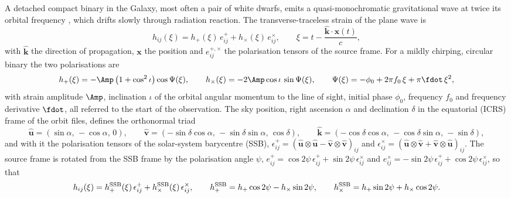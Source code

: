 A detached compact binary in the Galaxy, most often a pair of white dwarfs, emits a
quasi-monochromatic gravitational wave at twice its orbital frequency
\citep{nelemans2001gravitational,korol2017prospects}, which drifts slowly through radiation
reaction. The transverse-traceless strain of the plane wave is
\begin{equation}
  h_{ij}(\xi) = h_+(\xi)\,e^+_{ij} + h_\times(\xi)\,e^\times_{ij},\qquad
  \xi = t - \frac{\hat{\mathbf k}\cdot\mathbf x(t)}{c},
  \label{eq:xi}
\end{equation}
with $\hat{\mathbf k}$ the direction of propagation, $\mathbf x$ the position and
$e^{+,\times}_{ij}$ the polarisation tensors of the source frame. For a mildly chirping,
circular binary the two polarisations are
\begin{equation}
  h_+(\xi) = -\Amp\,\bigl(1+\cos^2\iota\bigr)\cos\Psi(\xi),\qquad
  h_\times(\xi) = -2\Amp\cos\iota\,\sin\Psi(\xi),\qquad
  \Psi(\xi) = -\phi_0 + 2\pi f_0\,\xi + \pi\fdot\,\xi^2,
  \label{eq:waveform}
\end{equation}
with strain amplitude $\Amp$, inclination $\iota$ of the orbital angular momentum to the line
of sight, initial phase $\phi_0$, frequency $f_0$ and frequency derivative $\fdot$, all
referred to the start of the observation. The sky position, right ascension $\alpha$ and
declination $\delta$ in the equatorial (ICRS) frame of the orbit files, defines the
orthonormal triad
\begin{equation}
  \hat{\mathbf u} = (\sin\alpha,\,-\cos\alpha,\,0),\qquad
  \hat{\mathbf v} = (-\sin\delta\cos\alpha,\,-\sin\delta\sin\alpha,\,\cos\delta),\qquad
  \hat{\mathbf k} = (-\cos\delta\cos\alpha,\,-\cos\delta\sin\alpha,\,-\sin\delta),
  \label{eq:triad}
\end{equation}
and with it the polarisation tensors of the solar-system barycentre (SSB),
$\epsilon^+_{ij} = (\hat{\mathbf u}\otimes\hat{\mathbf u} - \hat{\mathbf v}\otimes\hat{\mathbf v})_{ij}$
and
$\epsilon^\times_{ij} = (\hat{\mathbf u}\otimes\hat{\mathbf v} + \hat{\mathbf v}\otimes\hat{\mathbf u})_{ij}$.
The source frame is rotated from the SSB frame by the polarisation angle $\psi$,
$e^+_{ij} = \cos2\psi\,\epsilon^+_{ij} + \sin2\psi\,\epsilon^\times_{ij}$ and
$e^\times_{ij} = -\sin2\psi\,\epsilon^+_{ij} + \cos2\psi\,\epsilon^\times_{ij}$, so that
\begin{equation}
  h_{ij}(\xi) = h_+^{\rm SSB}(\xi)\,\epsilon^+_{ij} + h_\times^{\rm SSB}(\xi)\,\epsilon^\times_{ij},
  \qquad
  h_+^{\rm SSB} = h_+\cos2\psi - h_\times\sin2\psi,\qquad
  h_\times^{\rm SSB} = h_+\sin2\psi + h_\times\cos2\psi .
  \label{eq:pol-ssb}
\end{equation}
